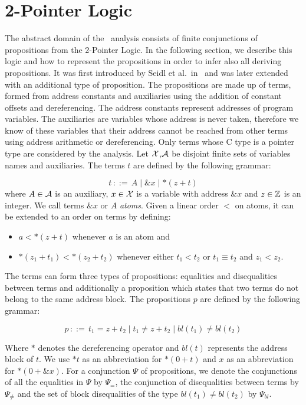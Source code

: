 \chapter{2-Pointer Logic}\label{chapter:2pointer}


The abstract domain of the \cpo\ analysis consists of finite conjunctions of propositions from the 2-Pointer Logic.
In the following section, we describe this logic and how to represent the propositions in order to
infer also all deriving propositions.
It was first introduced by Seidl et al.\ in~\cite{2pointer} and was later extended with an additional type of proposition.
The propositions are made up of terms, formed from address constants and auxiliaries using the addition of constant offsets and dereferencing.
The address constants represent addresses of program variables.
The auxiliaries are variables whose address is never taken, therefore
we know of these variables that their address cannot be reached from other terms using address arithmetic or dereferencing.
Only terms whose C type is a pointer type are considered by the analysis.
Let $\mathcal{X}$,$\mathcal{A}$ be disjoint finite sets of variables names and auxiliaries.
The terms $t$ are defined by the following grammar:

\[
    t\,{::=}\,A \mid \&x \mid *(z+t)
\]
where $A\in \mathcal{A}$ is an auxiliary, $x \in \mathcal{X}$ is a variable with address $\&x$ and $z \in \mathbb{Z}$ is an integer.
We call terms $\&x$ or $A$ \emph{atoms}.
Given a linear order $<$ on atoms, it can be extended to an order on terms by defining:
\begin{itemize}
    \item $a < *(z+t)$ whenever $a$ is an atom and
    \item $*(z_1 + t_1) < *(z_2 + t_2)$ whenever either $t_1 < t_2$ or $t_1 \equiv t_2$ and $z_1 < z_2$.
\end{itemize}

The terms can form three types of propositions: equalities and disequalities between terms and additionally a proposition which states that two terms do not belong to the same address block.
The propositions $p$ are defined by the following grammar:

\[
    p\,{::=}\,t_1=z+t_2 \mid t_1\neq z+t_2\mid bl(t_1) \neq bl(t_2)
\]

Where $*$ denotes the dereferencing operator and $bl(t)$ represents the address block of $t$.
We use $*t$ as an abbreviation for $*(0+t)$ and $x$ as an abbreviation for $*(0+\&x)$.
For a conjunction $\Psi$ of propositions, we denote the conjunctions of all the equalities in $\Psi$ by $\Psi_{=}$, the conjunction of disequalities between terms by $\Psi_{\neq}$ and the set of block disequalities of the type $bl(t_1) \neq bl(t_2)$ by $\Psi_{bl}$.


